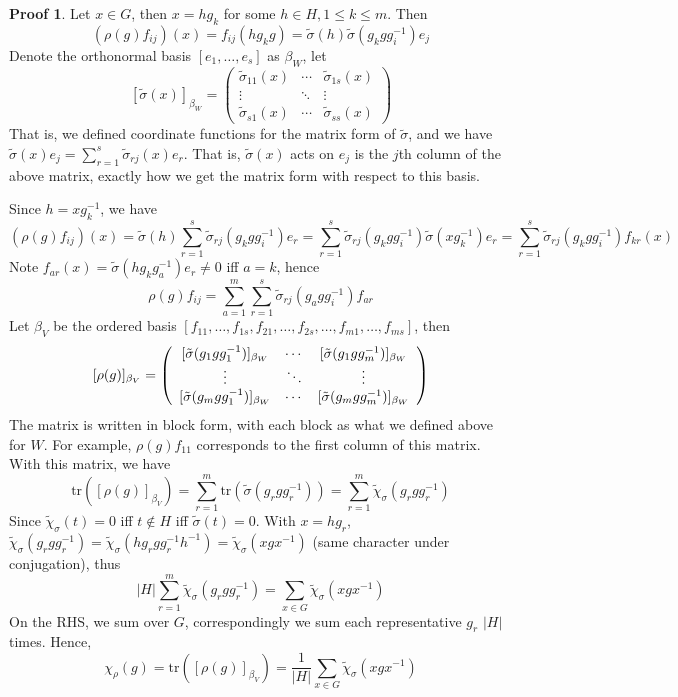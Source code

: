\documentclass{book}
\newcommand{\abs}[1]{\lvert #1 \rvert }
\newcommand{\tr}[1]{\textrm{tr}( #1 )}
\theoremstyle{definition}
\theoremstyle{remarkstyle}
\newtheorem*{myproof}{Proof}%
\begin{document}
\begin{myproof}
    Let $x\in G$, then $x=hg_k$ for some $h\in H, 1\le k\le m$. Then 
    $$
    (\rho(g)f_{ij})(x) = f_{ij}(hg_kg) = \tilde{\sigma}(h)\tilde{\sigma}(g_kgg^{-1}_i)e_j
    $$
    Denote the orthonormal basis $[e_1,\dots,e_s] $ as $\beta_W$, let 
    $$
    [\tilde{\sigma}(x)]_{\beta_W} = \left(
    \begin{array}{ccc}
        \tilde{\sigma}_{11}(x) & \cdots & \tilde{\sigma}_{1s}(x)  \\
        \vdots & \ddots & \vdots \\ 
        \tilde{\sigma}_{s1}(x) & \cdots & \tilde{\sigma}_{ss}(x)
    \end{array}
    \right)
    $$
    That is, we defined coordinate functions for the matrix form of $\tilde{\sigma}$, and we have $\tilde{\sigma}(x)e_j=\sum^s_{r=1}\tilde{\sigma}_{rj}(x)e_r $. That is, $\tilde{\sigma}(x)$ acts on $e_j$ is the $j$th column of the above matrix, exactly how we get the matrix form with respect to this basis. \newline 

    Since $h=xg^{-1}_k $, we have 
    $$
    (\rho(g)f_{ij})(x) = \tilde{\sigma}(h)\sum^{s}_{r=1}\tilde{\sigma}_{rj}(g_kgg^{-1}_i)e_r = \sum^s_{r=1}\tilde{\sigma}_{rj}(g_kgg^{-1}_i)\tilde{\sigma}(xg^{-1}_k)e_r = \sum^s_{r=1}\tilde{\sigma}_{rj}(g_kgg^{-1}_i)f_{kr}(x)
    $$
    Note $f_{ar}(x) = \tilde{\sigma}(hg_kg^{-1}_a)e_r\neq 0 $ iff $a=k$, hence 
    $$
    \rho(g)f_{ij} = \sum^m_{a=1}\sum^s_{r=1}\tilde{\sigma}_{rj}(g_agg^{-1}_i)f_{ar}
    $$
    Let $\beta_V$ be the ordered basis $[f_{11}, \dots, f_{1s}, f_{21}, \dots, f_{2s}, \dots, f_{m1}, \dots, f_{ms} ] $, then 
    $$
    [\rho(g)]_{\beta_V} = \left(
    \begin{array}{ccc}
        [\tilde{\sigma}(g_1gg^{-1}_1)]_{\beta_W} & \cdots & [\tilde{\sigma}(g_1gg^{-1}_m)]_{\beta_W}  \\
        \vdots & \ddots & \vdots \\\relax %
        [\tilde{\sigma}(g_m gg^{-1}_1)]_{\beta_W} & \cdots &[\tilde{\sigma}(g_mgg^{-1}_m)]_{\beta_W} 
    \end{array}
    \right)
    $$
    The matrix is written in block form, with each block as what we defined above for $W$. For example, $\rho(g)f_{11} $ corresponds to the first column of this matrix. With this matrix, we have 
    $$
    \tr{[\rho(g)]_{\beta_V}} = \sum^m_{r=1}\tr{\tilde{\sigma}(g_rgg^{-1}_r)} = \sum^m_{r=1}\tilde{\chi}_\sigma(g_rgg^{-1}_r)
    $$
    Since $\tilde{\chi}_\sigma(t)=0$ iff $t\notin H$ iff $\tilde{\sigma}(t)=0$. With $x=hg_r$, $\tilde{\chi}_\sigma(g_rgg^{-1}_r)= \tilde{\chi}_\sigma(hg_rgg^{-1}_rh^{-1}) = \tilde{\chi}_{\sigma}(xgx^{-1})$ (same character under conjugation), thus 
    $$
    \abs{H}\sum^m_{r=1}\tilde{\chi}_\sigma(g_rgg^{-1}_r) = \sum_{x\in G}\tilde{\chi}_\sigma(xgx^{-1})
    $$
    On the RHS, we sum over $G$, correspondingly we sum each representative $g_r$ $\abs{H}$ times. Hence,
    $$
    \chi_\rho(g) = \tr{[\rho(g)]_{\beta_V}} = \frac{1}{\abs{H}}\sum_{x\in G}\tilde{\chi}_\sigma(xgx^{-1})
    $$\newline
\end{myproof}
\end{document}
